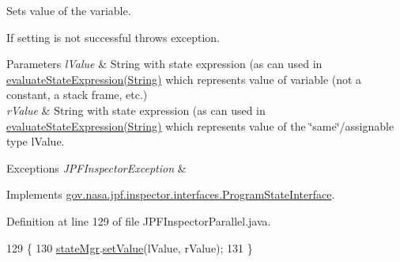 Sets value of the variable. 

If setting is not successful throws exception.


\begin{DoxyParams}{Parameters}
{\em l\+Value} & String with state expression (as can used in \hyperlink{classgov_1_1nasa_1_1jpf_1_1inspector_1_1server_1_1jpf_1_1_j_p_f_inspector_parallel_a6b844731ae2bc8d6934ad1c731dce319}{evaluate\+State\+Expression(\+String)} which represents value of variable (not a constant, a stack frame, etc.) \\
\hline
{\em r\+Value} & String with state expression (as can used in \hyperlink{classgov_1_1nasa_1_1jpf_1_1inspector_1_1server_1_1jpf_1_1_j_p_f_inspector_parallel_a6b844731ae2bc8d6934ad1c731dce319}{evaluate\+State\+Expression(\+String)} which represents value of the \char`\"{}same\char`\"{}/assignable type l\+Value. \\
\hline
\end{DoxyParams}

\begin{DoxyExceptions}{Exceptions}
{\em J\+P\+F\+Inspector\+Exception} & \\
\hline
\end{DoxyExceptions}


Implements \hyperlink{interfacegov_1_1nasa_1_1jpf_1_1inspector_1_1interfaces_1_1_program_state_interface_a992e2deda1c948e41ae9abcc776eec7b}{gov.\+nasa.\+jpf.\+inspector.\+interfaces.\+Program\+State\+Interface}.



Definition at line 129 of file J\+P\+F\+Inspector\+Parallel.\+java.


\begin{DoxyCode}
129                                                                                    \{
130     \hyperlink{classgov_1_1nasa_1_1jpf_1_1inspector_1_1server_1_1jpf_1_1_j_p_f_inspector_ae9f172366498ddc7e73112122f69fc56}{stateMgr}.\hyperlink{classgov_1_1nasa_1_1jpf_1_1inspector_1_1server_1_1programstate_1_1_program_state_manager_a75133d9acd32d5e0d94e63b25594866b}{setValue}(lValue, rValue);
131   \}
\end{DoxyCode}
